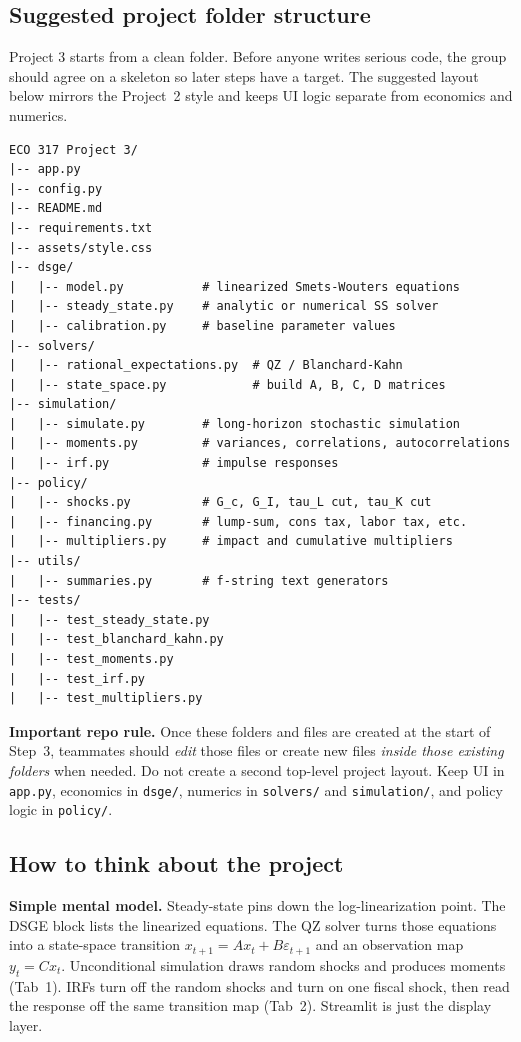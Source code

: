 \documentclass[11pt]{article}
\begin{document}
\subsection{Suggested project folder structure}
Project 3 starts from a clean folder. Before anyone writes serious code, the group should agree on a skeleton so later steps have a target. The suggested layout below mirrors the Project~2 style and keeps UI logic separate from economics and numerics.

\begin{lstlisting}
ECO 317 Project 3/
|-- app.py
|-- config.py
|-- README.md
|-- requirements.txt
|-- assets/style.css
|-- dsge/
|   |-- model.py           # linearized Smets-Wouters equations
|   |-- steady_state.py    # analytic or numerical SS solver
|   |-- calibration.py     # baseline parameter values
|-- solvers/
|   |-- rational_expectations.py  # QZ / Blanchard-Kahn
|   |-- state_space.py            # build A, B, C, D matrices
|-- simulation/
|   |-- simulate.py        # long-horizon stochastic simulation
|   |-- moments.py         # variances, correlations, autocorrelations
|   |-- irf.py             # impulse responses
|-- policy/
|   |-- shocks.py          # G_c, G_I, tau_L cut, tau_K cut
|   |-- financing.py       # lump-sum, cons tax, labor tax, etc.
|   |-- multipliers.py     # impact and cumulative multipliers
|-- utils/
|   |-- summaries.py       # f-string text generators
|-- tests/
|   |-- test_steady_state.py
|   |-- test_blanchard_kahn.py
|   |-- test_moments.py
|   |-- test_irf.py
|   |-- test_multipliers.py
\end{lstlisting}

\begin{notebox}
\textbf{Important repo rule.} Once these folders and files are created at the start of Step~3, teammates should \emph{edit} those files or create new files \emph{inside those existing folders} when needed. Do not create a second top-level project layout. Keep UI in \texttt{app.py}, economics in \texttt{dsge/}, numerics in \texttt{solvers/} and \texttt{simulation/}, and policy logic in \texttt{policy/}.
\end{notebox}

\subsection{How to think about the project}
\begin{intuitbox}
\textbf{Simple mental model.} Steady-state pins down the log-linearization point. The DSGE block lists the linearized equations. The QZ solver turns those equations into a state-space transition $x_{t+1}=A x_t + B \varepsilon_{t+1}$ and an observation map $y_t = C x_t$. Unconditional simulation draws random shocks and produces moments (Tab~1). IRFs turn off the random shocks and turn on one fiscal shock, then read the response off the same transition map (Tab~2). Streamlit is just the display layer.
\end{intuitbox}
\end{document}
